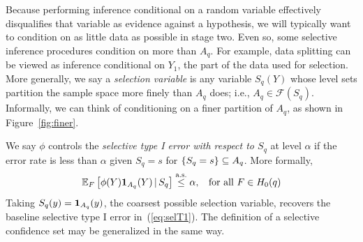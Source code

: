 \documentclass{article}
\theoremstyle{definition}
\newcommand{\sF}{\mathscr{F}}
\newcommand{\leqAS}{\overset{\textrm{a.s.}}{\leq}}
\newcommand{\sampOrData}{data }
\begin{document}
Because performing inference conditional on a random variable effectively disqualifies that variable as evidence against a hypothesis, we will typically want to condition on as little data as possible in stage two. Even so, some selective inference procedures condition on more than $A_q$. For example, \sampOrData splitting can be viewed as inference conditional on $Y_{1}$, the part of the data used for selection. More generally, we say a {\em selection variable} is any variable $S_q(Y)$ whose level sets partition the sample space more finely than $A_q$ does; i.e., $A_q \in \sF(S_q)$. Informally, we can think of conditioning on a finer partition of $A_q$, as shown in Figure~\ref{fig:finer}.


We say $\phi$ controls the {\em selective type I error with respect to $S_q$} at level $\alpha$ if the error rate is less than $\alpha$ given $S_q=s$ for $\{S_q=s\}\subseteq A_q$. More formally,
\begin{equation}\label{eq:selT1S}
  \E_F\left[\phi(Y)\1_{A_q}(Y) \gv S_q \right] \leqAS \alpha, \;\;\text{ for all } F\in H_0(q)
\end{equation}
Taking $S_q(y) = \mathbf{1}_{A_q}(y)$, the coarsest possible selection variable, recovers the baseline selective type I error in~(\ref{eq:selT1}). The definition of a selective confidence set may be generalized in the same way.
\end{document}
